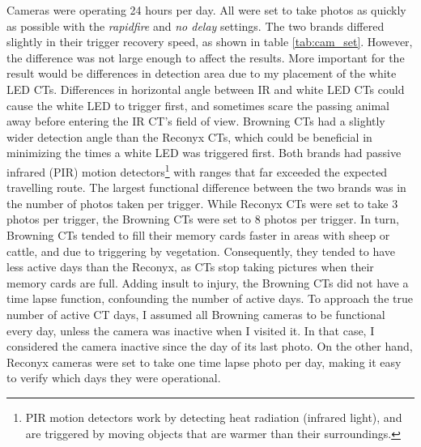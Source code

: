 Cameras were operating 24 hours per day. All were set to take photos as quickly as possible with the \emph{rapidfire} and \emph{no delay} settings. 
The two brands differed slightly in their trigger recovery speed, as shown in table \ref{tab:cam_set}.
However, the difference was not large enough to affect the results. 
More important for the result would be differences in detection area due to my placement of the white LED CTs.
Differences in horizontal angle between IR and white LED CTs could cause the white LED to trigger first, and sometimes scare the passing animal away before entering the IR CT's field of view.
Browning CTs had a slightly wider detection angle than the Reconyx CTs, which could be beneficial in minimizing the times a white LED was triggered first.
Both brands had passive infrared (PIR) motion detectors\footnote{PIR motion detectors work by detecting heat radiation (infrared light), and are triggered by moving objects that are warmer than their surroundings.} 
with ranges that far exceeded the expected travelling route. 
The largest functional difference between the two brands was in the number of photos taken per trigger. 
While Reconyx CTs were set to take 3 photos per trigger, the Browning CTs were set to 8 photos per trigger. In turn, Browning CTs tended to fill their memory cards faster in areas with sheep or cattle, and due to triggering by vegetation.
Consequently, they tended to have less active days than the Reconyx, as CTs stop taking pictures when their memory cards are full.
Adding insult to injury, the Browning CTs did not have a time lapse function, confounding the number of active days.
To approach the true number of active CT days, I assumed all Browning cameras to be functional every day, unless the camera was inactive when I visited it. In that case, I considered the camera inactive since the day of its last photo.
On the other hand, Reconyx cameras were set to take one time lapse photo per day, making it easy to verify which days they were operational.
















